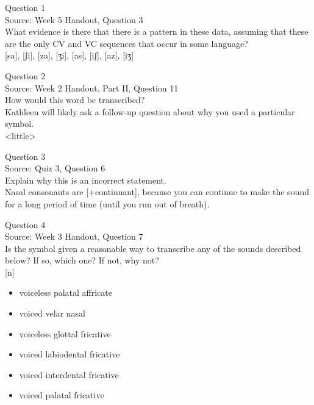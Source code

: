 \documentclass[12pt]{article}
\begin{document}
{\large Question 1}\\

Source: Week 5 Handout, Question 3\\

What evidence is there that there is a pattern in these data, assuming that these are the only CV and VC sequences that occur in some language?\\

{[sa]}, {[ʃi]}, {[za]}, {[ʒi]}, {[as]}, {[iʃ]}, {[az]}, {[iʒ]}


\newpage

{\large Question 2}\\

Source: Week 2 Handout, Part II, Question 11\\

How would this word be transcribed?\\ Kathleen will likely ask a follow-up question about why you used a particular symbol.\\

<little>


\newpage

{\large Question 3}\\

Source: Quiz 3, Question 6\\

Explain why this is an incorrect statement.\\

Nasal consonants are {[+continuant]}, because you can continue to make the sound for a long period of time (until you run out of breath).


\newpage

{\large Question 4}\\

Source: Week 3 Handout, Question 7\\

Is the symbol given a reasonable way to transcribe any of the sounds described below? If so, which one? If not, why not?\\

{[n]}

\begin{itemize} \item voiceless palatal affricate \item voiced velar nasal \item voiceless glottal fricative \item voiced labiodental fricative \item voiced interdental fricative \item voiced palatal fricative \end{itemize}
\end{document}
